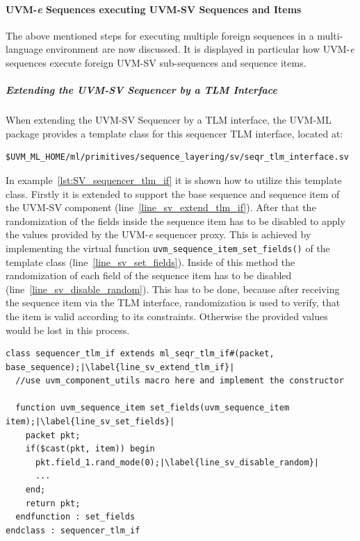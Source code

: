\paragraph{UVM-\textit{e} Sequences executing UVM-SV Sequences and Items}
The above mentioned steps for executing multiple foreign sequences in a multi-language environment are now discussed. It is displayed in particular how UVM-\textit{e} sequences execute foreign UVM-SV sub-sequences and sequence items.
\subparagraph{Extending the UVM-SV Sequencer by a TLM Interface}
When extending the UVM-SV Sequencer by a TLM interface, the UVM-ML package provides a template class for this sequencer TLM interface, located at:
\smallskip
{}
\begin{lstlisting}
$UVM_ML_HOME/ml/primitives/sequence_layering/sv/seqr_tlm_interface.sv
\end{lstlisting} 
\smallskip
In example~\ref{lst:SV_sequencer_tlm_if} it is shown how to utilize this template class. Firstly it is extended to support the base sequence and sequence item of the UVM-SV component (line~\ref{line_sv_extend_tlm_if}). After that the randomization of the fields inside the sequence item has to be disabled to apply the values provided by the UVM-\textit{e} sequencer proxy. This is achieved by implementing the virtual function \lstinline$uvm_sequence_item_set_fields()$ of the template class (line~\ref{line_sv_set_fields}). Inside of this method the randomization of each field of the sequence item has to be disabled (line~\ref{line_sv_disable_random}). This has to be done, because after receiving the sequence item via the TLM interface, randomization is used to verify, that the item is valid according to its constraints. Otherwise the provided values would be lost in this process.
\lstset{language=SystemVerilog, numbers = left, escapechar=|, breaklines=true}
\begin{lstlisting}[frame=htrbl, caption={SystemVerilog: creating the TLM interface for the sequencer},
label={lst:SV_sequencer_tlm_if}]
class sequencer_tlm_if extends ml_seqr_tlm_if#(packet, base_sequence);|\label{line_sv_extend_tlm_if}|
  //use uvm_component_utils macro here and implement the constructor

  function uvm_sequence_item set_fields(uvm_sequence_item item);|\label{line_sv_set_fields}|
    packet pkt;   
    if($cast(pkt, item)) begin
      pkt.field_1.rand_mode(0);|\label{line_sv_disable_random}|
      ...
    end;
    return pkt;      
  endfunction : set_fields
endclass : sequencer_tlm_if
\end{lstlisting}
